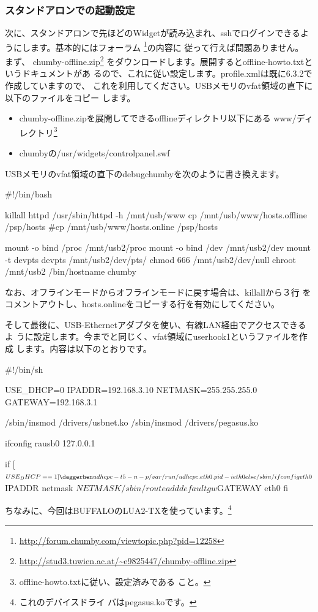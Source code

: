 \documentclass[mingoth,a4paper]{jsarticle}
\begin{document}
\begin{multicols}{2}
\subsubsection{スタンドアロンでの起動設定}
次に、スタンドアロンで先ほどのWidgetが読み込まれ、sshでログインできるよ
うにします。基本的にはフォーラム
\footnote{\url{http://forum.chumby.com/viewtopic.php?pid=12258}}の内容に
従って行えば問題ありません。
まず、
chumby-offline.zip\footnote{\url{http://stud3.tuwien.ac.at/~e9825447/chumby-offline.zip}}
をダウンロードします。展開するとoffline-howto.txtというドキュメントがあ
るので、これに従い設定します。profile.xmlは既に6.3.2で作成していますので、
これを利用してください。USBメモリのvfat領域の直下に以下のファイルをコピー
します。
\begin{itemize}
\item chumby-offline.zipを展開してできるofflineディレクトリ以下にある
      www/ディレクトリ\footnote{offline-howto.txtに従い、設定済みである
      こと。}
\item chumbyの/usr/widgets/controlpanel.swf
\end{itemize}
USBメモリのvfat領域の直下のdebugchumbyを次のように書き換えます。
\begin{commandline}
#!/bin/bash

killall httpd
/usr/sbin/httpd -h /mnt/usb/www
cp /mnt/usb/www/hosts.offline /psp/hosts
#cp /mnt/usb/www/hosts.online /psp/hosts

mount -o bind /proc /mnt/usb2/proc
mount -o bind /dev  /mnt/usb2/dev
mount -t devpts devpts /mnt/usb2/dev/pts/
chmod 666 /mnt/usb2/dev/null
chroot /mnt/usb2 /bin/hostname chumby
\end{commandline}
なお、オフラインモードからオフラインモードに戻す場合は、killallから３行
をコメントアウトし、hosts.onlineをコピーする行を有効にしてください。

そして最後に、USB-Ethernetアダプタを使い、有線LAN経由でアクセスできるよ
うに設定します。今までと同じく、vfat領域にuserhook1というファイルを作成
します。内容は以下のとおりです。
\begin{commandline}
#!/bin/sh

USE_DHCP=0
IPADDR=192.168.3.10
NETMASK=255.255.255.0
GATEWAY=192.168.3.1

/sbin/insmod /drivers/usbnet.ko
/sbin/insmod /drivers/pegasus.ko

ifconfig rausb0 127.0.0.1

if [ $USE_DHCP == 1 ]\daggerhen
   udhcpc -t 5 -n -p /var/run/udhcpc.eth0.pid -i eth0
else
   /sbin/ifconfig eth0 $IPADDR netmask $NETMASK
   /sbin/route add default gw $GATEWAY eth0
fi 
\end{commandline}
ちなみに、今回はBUFFALOのLUA2-TXを使っています。\footnote{これのデバイスドライ
バはpegasus.koです。}


\end{multicols}
\end{document}
